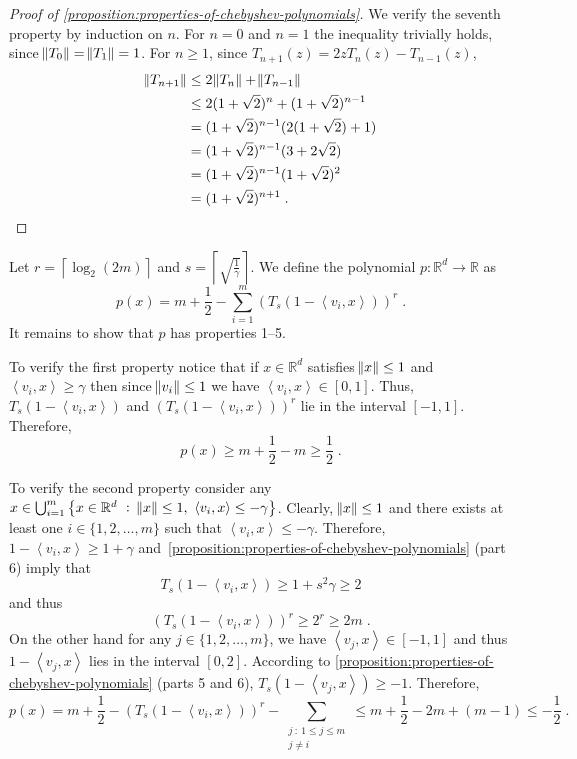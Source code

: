\documentclass[12pt]{article}
\newcommand{\R}{\mathbb{R}}  %
\newcommand{\ip}[2]{\left\langle #1, #2 \right\rangle} %
\begin{document}
\begin{proof}[Proof of \autoref{proposition:properties-of-chebyshev-polynomials}]
We verify the seventh property by induction on $n$.
For $n=0$ and $n=1$ the inequality trivially holds, since $\norm{T_0} = \norm{T_1} = 1$.
For $n \ge 1$, since $T_{n+1}(z) = 2zT_n(z) - T_{n-1}(z)$,
\begin{align*}
\norm{T_{n+1}}
& \le 2 \norm{T_n} + \norm{T_{n-1}} \\
& \le 2 (1 + \sqrt{2})^n + (1 + \sqrt{2})^{n-1} \\
& = (1 + \sqrt{2})^{n-1} (2 (1 + \sqrt{2}) + 1) \\
& = (1 + \sqrt{2})^{n-1} (3 + 2\sqrt{2}) \\
& = (1 + \sqrt{2})^{n-1} (1 + \sqrt{2})^2 \\
& = (1 + \sqrt{2})^{n+1} \; .
\end{align*}

\end{proof}

Let $r = \left\lceil \log_2(2m) \right\rceil$ and $s = \left\lceil \sqrt{\frac{1}{\gamma}} \right\rceil$.
We define the polynomial $p:\R^d \to \R$ as
$$
p(x) = m + \frac{1}{2} - \sum_{i=1}^m \left( T_s(1 - \ip{v_i}{x}) \right)^r \; .
$$
It remains to show that $p$ has properties 1--5.

To verify the first property notice that if $x \in \R^d$ satisfies $\norm{x} \le
1$ and $\ip{v_i}{x} \ge \gamma$ then since $\norm{v_i} \le 1$ we have
$\ip{v_i}{x} \in [0,1]$. Thus, $T_s(1 - \ip{v_i}{x})$ and $\left( T_s(1 -
\ip{v_i}{x}) \right)^r$ lie in the interval $[-1,1]$. Therefore,
$$
p(x) \ge m + \frac{1}{2} - m \ge \frac{1}{2} \; .
$$

To verify the second property consider any $x \in \bigcup_{i=1}^m \left\{ x \in \R^d
~:~ \norm{x} \le 1, \ \ip{v_i}{x} \le - \gamma \right\}$. Clearly, $\norm{x} \le 1$
and there exists at least one $i \in \{1,2,\dots,m\}$ such that $\ip{v_i}{x} \le
- \gamma$. Therefore, $1 - \ip{v_i}{x} \ge 1 + \gamma$ and~\autoref{proposition:properties-of-chebyshev-polynomials} (part 6)
imply that
$$
T_s(1 - \ip{v_i}{x}) \ge 1 + s^2 \gamma \ge 2
$$
and thus
$$
\left( T_s(1 - \ip{v_i}{x}) \right)^r \ge 2^r \ge 2m \; .
$$
On the other hand for any $j \in \{1,2,\dots,m\}$, we have $\ip{v_j}{x} \in
[-1,1]$ and thus $1 - \ip{v_j}{x}$ lies in the interval $[0,2]$. According to
\autoref{proposition:properties-of-chebyshev-polynomials} (parts 5 and 6), $T_s(1 - \ip{v_j}{x})
\ge -1$. Therefore,
$$
p(x) = m + \frac{1}{2} - \left( T_s(1 - \ip{v_i}{x}) \right)^r - \sum_{\substack{j ~:~  1 \le j \le m \\ j \neq i}} \le m + \frac{1}{2} - 2m + (m - 1) \le - \frac{1}{2} \; .
$$
\end{document}
